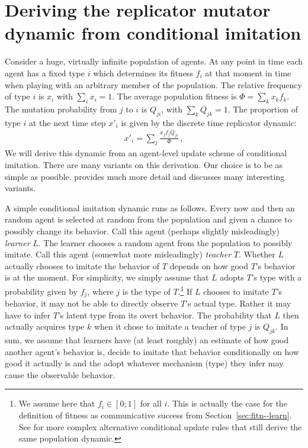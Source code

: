 \documentclass[a4paper, 11pt]{article}
\theoremstyle{Satz}
\begin{document}
\section{Deriving the replicator mutator dynamic from conditional imitation}
\label{sec:deriv-repl-mutat}

Consider a huge, virtually infinite population of agents. At any point in time each agent has a
fixed type $i$ which determines its fitness $f_i$ at that moment in time when playing with an
arbitrary member of the population. The relative frequency of type $i$ is $x_i$ with
$\sum_i x_i = 1$. The average population fitness is $\Phi = \sum_k x_k f_k$. The mutation
probability from $j$ to $i$ is $Q_{ji}$, with $\sum_k Q_{jk} = 1$. The proportion of type $i$
at the next time step $x'_i$ is given by the discrete time replicator dynamic:
\begin{align}
  \label{eq:RMD_discrete_repeated}
  x'_i = \sum_j \frac{x_jf_j Q_{ji}}{\Phi}\,,
\end{align}
We will derive this dynamic from an agent-level update scheme of conditional imitation. There
are many variants on this derivation. Our choice is to be as simple as
possible. \citet{Sandholm2010:Population-Game} provides much more detail and discusses many
interesting variants.

A simple conditional imitation dynamic runs as follows. Every now and then an random agent is
selected at random from the population and given a chance to possibly change its behavior. Call
this agent (perhaps slightly misleadingly) \emph{learner} $L$. The learner chooses a random
agent from the population to possibly imitate. Call this agent (somewhat more misleadingly)
\emph{teacher} $T$. Whether $L$ actually chooses to imitate the behavior of $T$ depends on how
good $T$'s behavior is at the moment. For simplicity, we simply assume that $L$ adopts $T$'s
type with a probability given by $f_j$, where $j$ is the type of $T$.\footnote{We assume here
  that $f_i \in [0;1]$ for all $i$. This is actually the case for the definition of fitness as
  communicative success from Section~\ref{sec:fitn--learn}. See
  \citet{Sandholm2010:Population-Game} for more complex alternative conditional update rules
  that still derive the same population dynamic.} 
If $L$ chooses to imitate $T$'s behavior, it may not be able to directly observe $T$'s actual
type. Rather it may have to infer $T$'s latent type from its overt behavior. The probability
that $L$ then actually acquires type $k$ when it chose to imitate a teacher of type $j$ is
$Q_{jk}$. In sum, we assume that learners have (at least roughly) an estimate of how good
another agent's behavior is, decide to imitate that behavior conditionally on how good it
actually is and the adopt whatever mechanism (type) they infer may cause the observable
behavior. 
\end{document}
